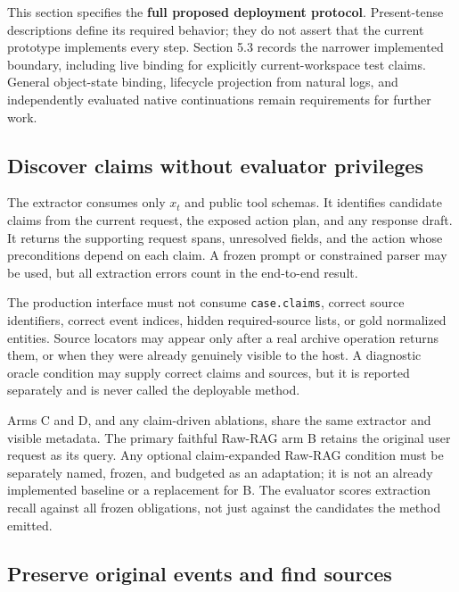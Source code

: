 This section specifies the \textbf{full proposed deployment protocol}.
Present-tense descriptions define its required behavior; they do not
assert that the current prototype implements every step. Section 5.3
records the narrower implemented boundary, including live binding for
explicitly current-workspace test claims. General object-state binding,
lifecycle projection from natural logs, and independently evaluated
native continuations remain requirements for further work.

\subsection{Discover claims without evaluator
privileges}\label{discover-claims-without-evaluator-privileges}

The extractor consumes only \(x_t\) and public tool schemas. It
identifies candidate claims from the current request, the exposed action
plan, and any response draft. It returns the supporting request spans,
unresolved fields, and the action whose preconditions depend on each
claim. A frozen prompt or constrained parser may be used, but all
extraction errors count in the end-to-end result.

The production interface must not consume \texttt{case.claims}, correct
source identifiers, correct event indices, hidden required-source lists,
or gold normalized entities. Source locators may appear only after a
real archive operation returns them, or when they were already genuinely
visible to the host. A diagnostic oracle condition may supply correct
claims and sources, but it is reported separately and is never called
the deployable method.

Arms C and D, and any claim-driven ablations, share the same extractor
and visible metadata. The primary faithful Raw-RAG arm B retains the
original user request as its query. Any optional claim-expanded Raw-RAG
condition must be separately named, frozen, and budgeted as an
adaptation; it is not an already implemented baseline or a replacement
for B. The evaluator scores extraction recall against all frozen
obligations, not just against the candidates the method emitted.

\subsection{Preserve original events and find
sources}\label{preserve-original-events-and-find-sources}


